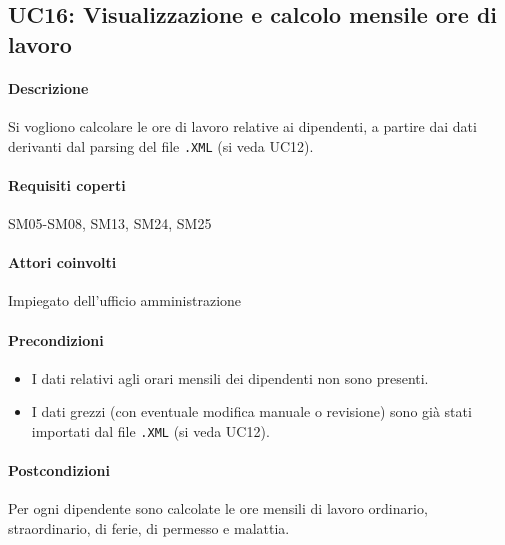\subsection{UC16: Visualizzazione e calcolo mensile ore di lavoro}
\paragraph{Descrizione}
Si vogliono calcolare le ore di lavoro relative ai dipendenti, a partire dai dati derivanti dal parsing del file \verb|.XML| (si veda UC12).
\paragraph{Requisiti coperti}
SM05-SM08, SM13, SM24, SM25
\paragraph{Attori coinvolti}
Impiegato dell'ufficio amministrazione
\paragraph{Precondizioni}
\begin{itemize}
	\item I dati relativi agli orari mensili dei dipendenti non sono presenti.
	\item I dati grezzi (con eventuale modifica manuale o revisione) sono già stati importati dal file \verb|.XML| (si veda UC12).
\end{itemize}
\paragraph{Postcondizioni}
Per ogni dipendente sono calcolate le ore mensili di lavoro ordinario, straordinario, di ferie, di permesso e malattia.
